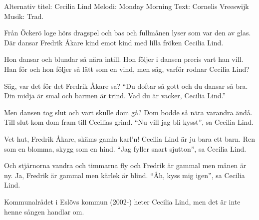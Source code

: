 \begin{song}


\begin{songmeta}
Alternativ titel: Cecilia Lind
Melodi: Monday Morning
Text: Cornelis Vreeswijk
Musik: Trad.
\end{songmeta}

\begin{songtext}
Från Öckerö loge hörs dragspel och bas
och fullmånen lyser som var den av glas.
Där dansar Fredrik Åkare kind emot kind
med lilla fröken Cecilia Lind.

Hon dansar och blundar så nära intill.
Hon följer i dansen precis vart han vill.
Han för och hon följer så lätt som en vind,
men säg, varför rodnar Cecilia Lind?

Säg, var det för det Fredrik Åkare sa?
\textquotedblleft{}Du doftar så gott och du dansar så bra.
Din midja är smal och barmen är trind.
Vad du är vacker, Cecilia Lind.\textquotedblright{}

Men dansen tog slut och vart skulle dom gå?
Dom bodde så nära varandra ändå.
Till slut kom dom fram till Cecilias grind.
\textquotedblleft{}Nu vill jag bli kysst\textquotedblright{}, sa Cecilia Lind.

\newpage
Vet hut, Fredrik Åkare, skäms gamla karl'n!
Cecilia Lind är ju bara ett barn.
Ren som en blomma, skygg som en hind.
\textquotedblleft{}Jag fyller snart sjutton\textquotedblright{}, sa Cecilia Lind.

Och stjärnorna vandra och timmarna fly
och Fredrik är gammal men månen är ny.
Ja, Fredrik är gammal men kärlek är blind.
\textquotedblleft{}Åh, kyss mig igen\textquotedblright{}, sa Cecilia Lind.
\end{songtext}

\begin{songnotes}
Kommunalrådet i Eslövs kommun (2002-) heter Cecilia Lind, men det är inte henne sången handlar om.
\end{songnotes}

\end{song}
